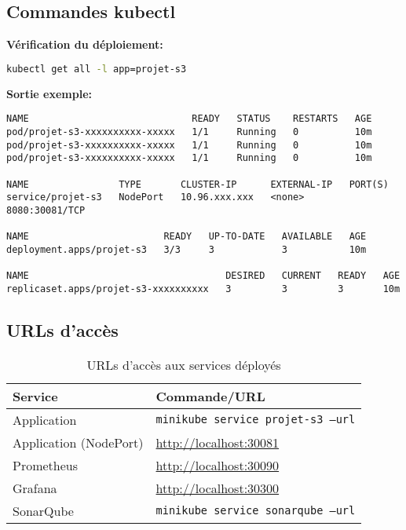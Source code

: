 \documentclass[12pt,a4paper]{article}
\begin{document}
\subsection{Commandes kubectl}

\textbf{Vérification du déploiement:}
\begin{lstlisting}[language=bash]
kubectl get all -l app=projet-s3
\end{lstlisting}

\textbf{Sortie exemple:}
\begin{lstlisting}
NAME                             READY   STATUS    RESTARTS   AGE
pod/projet-s3-xxxxxxxxxx-xxxxx   1/1     Running   0          10m
pod/projet-s3-xxxxxxxxxx-xxxxx   1/1     Running   0          10m
pod/projet-s3-xxxxxxxxxx-xxxxx   1/1     Running   0          10m

NAME                TYPE       CLUSTER-IP      EXTERNAL-IP   PORT(S)
service/projet-s3   NodePort   10.96.xxx.xxx   <none>        8080:30081/TCP

NAME                        READY   UP-TO-DATE   AVAILABLE   AGE
deployment.apps/projet-s3   3/3     3            3           10m

NAME                                   DESIRED   CURRENT   READY   AGE
replicaset.apps/projet-s3-xxxxxxxxxx   3         3         3       10m
\end{lstlisting}

\subsection{URLs d'accès}

\begin{table}[H]
\centering
\begin{tabular}{|l|l|}
\hline
\textbf{Service} & \textbf{Commande/URL} \\ \hline
Application & \texttt{minikube service projet-s3 --url} \\ \hline
Application (NodePort) & \url{http://localhost:30081} \\ \hline
Prometheus & \url{http://localhost:30090} \\ \hline
Grafana & \url{http://localhost:30300} \\ \hline
SonarQube & \texttt{minikube service sonarqube --url} \\ \hline
\end{tabular}
\caption{URLs d'accès aux services déployés}
\label{tab:k8s_urls}
\end{table}
\end{document}
